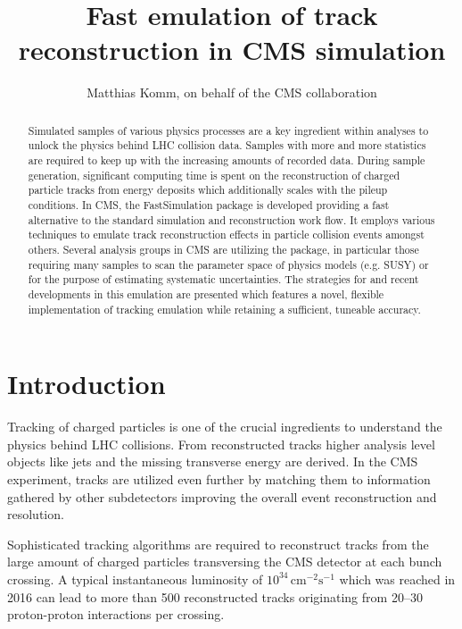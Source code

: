 \documentclass[a4paper]{jpconf}
\begin{document}
\title{Fast emulation of track reconstruction in CMS simulation}

\author{Matthias Komm, on behalf of the CMS collaboration}

\address{Centre for Cosmology, Particle Physics and Phenomenology,
Universit\'e catholique de Louvain, Louvain-la-Neuve, BELGIUM}


\begin{abstract}
Simulated samples of various physics processes are a key ingredient within analyses to unlock the physics behind LHC collision data. Samples with more and more statistics are required to keep up with the increasing amounts of recorded data. During sample generation, significant computing time is spent on the reconstruction of charged particle tracks from energy deposits which additionally scales with the pileup conditions. In CMS, the FastSimulation package is developed providing a fast alternative to the standard simulation and reconstruction work flow. It employs various techniques to emulate track reconstruction effects in particle collision events amongst others. Several analysis groups in CMS are utilizing the package, in particular those requiring many samples to scan the parameter space of physics models (e.g. SUSY) or for the purpose of estimating systematic uncertainties. The strategies for and recent developments in this emulation are presented which features a novel, flexible implementation of tracking emulation while retaining a sufficient, tuneable accuracy.
\end{abstract}


\section{Introduction}
Tracking of charged particles is one of the crucial ingredients to understand the physics behind LHC collisions. From reconstructed tracks higher analysis level objects like jets and the missing transverse energy are derived. In the CMS experiment, tracks are utilized even further by matching them to information gathered by other subdetectors improving the overall event reconstruction and resolution.

Sophisticated tracking algorithms are required to reconstruct tracks from the large amount of charged particles transversing the CMS detector at each bunch crossing. A typical instantaneous luminosity of $10^{34}\,\mathrm{cm}^{-2}\mathrm{s}^{-1}$ which was reached in 2016 can lead to more than 500 reconstructed tracks originating from 20--30 proton-proton interactions per crossing.
\end{document}

